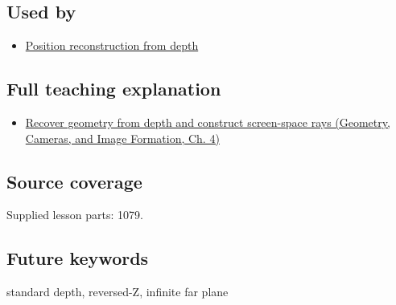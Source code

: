 \subsection{Used by}\label{appendix-1bc40b08db4a-used-by}

\begin{itemize}
\tightlist
\item
  \hyperref[appendix-2cbf2968e866]{Position reconstruction from depth}
\end{itemize}

\subsection{Full teaching explanation}\label{appendix-1bc40b08db4a-full-teaching-explanation}

\begin{itemize}
\tightlist
\item
  \href{../03-Geometry-Cameras-and-Image-Formation/main.pdf\#nameddest=02-foundations-ii-ch035-recover-geometry-from-depth-and-construct-screen-space-rays}{Recover geometry from depth and construct screen-space rays (Geometry, Cameras, and Image Formation, Ch. 4)}
\end{itemize}

\subsection{Source coverage}\label{appendix-1bc40b08db4a-source-coverage}

Supplied lesson parts: 1079.

\subsection{Future keywords}\label{appendix-1bc40b08db4a-future-keywords}

standard depth, reversed-Z, infinite far plane
